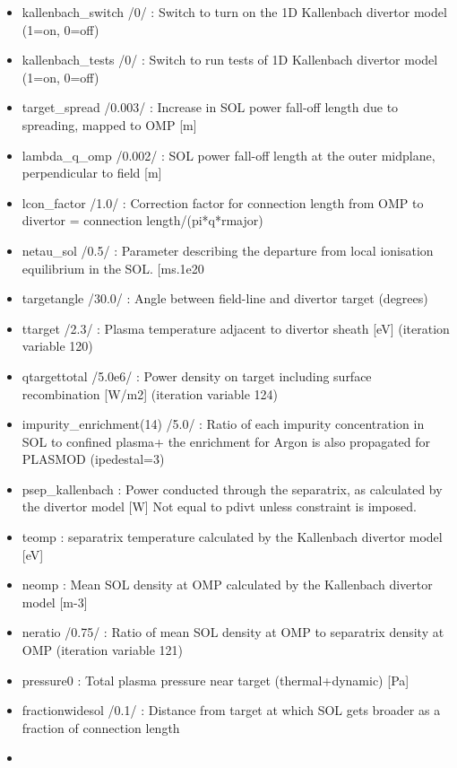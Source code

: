 \documentclass[]{article}
\begin{document}
\begin{itemize}
\itemsep1pt\parskip0pt
\item
  kallenbach\_switch /0/ : Switch to turn on the 1D Kallenbach divertor
  model (1=on, 0=off)
\item
  kallenbach\_tests /0/ : Switch to run tests of 1D Kallenbach divertor
  model (1=on, 0=off)
\item
  target\_spread /0.003/ : Increase in SOL power fall-off length due to
  spreading, mapped to OMP {[}m{]}
\item
  lambda\_q\_omp /0.002/ : SOL power fall-off length at the outer
  midplane, perpendicular to field {[}m{]}
\item
  lcon\_factor /1.0/ : Correction factor for connection length from OMP
  to divertor = connection length/(pi*q*rmajor)
\item
  netau\_sol /0.5/ : Parameter describing the departure from local
  ionisation equilibrium in the SOL. {[}ms.1e20
\item
  targetangle /30.0/ : Angle between field-line and divertor target
  (degrees)
\item
  ttarget /2.3/ : Plasma temperature adjacent to divertor sheath
  {[}eV{]} (iteration variable 120)
\item
  qtargettotal /5.0e6/ : Power density on target including surface
  recombination {[}W/m2{]} (iteration variable 124)
\item
  impurity\_enrichment(14) /5.0/ : Ratio of each impurity concentration
  in SOL to confined plasma+ the enrichment for Argon is also propagated
  for PLASMOD (ipedestal=3)
\item
  psep\_kallenbach : Power conducted through the separatrix, as
  calculated by the divertor model {[}W{]} Not equal to pdivt unless
  constraint is imposed.
\item
  teomp : separatrix temperature calculated by the Kallenbach divertor
  model {[}eV{]}
\item
  neomp : Mean SOL density at OMP calculated by the Kallenbach divertor
  model {[}m-3{]}
\item
  neratio /0.75/ : Ratio of mean SOL density at OMP to separatrix
  density at OMP (iteration variable 121)
\item
  pressure0 : Total plasma pressure near target (thermal+dynamic)
  {[}Pa{]}
\item
  fractionwidesol /0.1/ : Distance from target at which SOL gets broader
  as a fraction of connection length
\item

\end{itemize}
\end{document}
